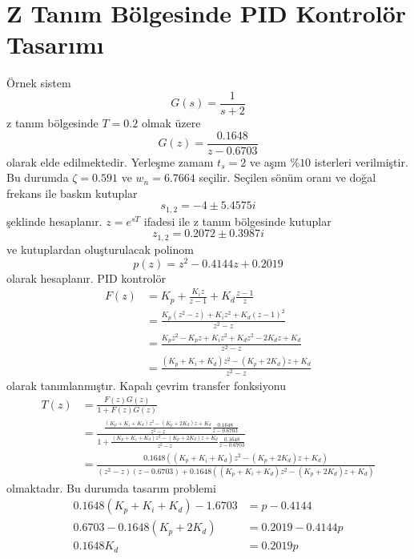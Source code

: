 \chapter{Z Tanım Bölgesinde PID Kontrolör Tasarımı}
Örnek sistem
\begin{equation}
    G(s)=\frac{1}{s+2}
\end{equation}
z tanım bölgesinde $T=0.2$ olmak üzere
\begin{equation}
    G(z)=\frac{0.1648}{z-0.6703}
\end{equation}
olarak elde edilmektedir. Yerleşme zamanı $t_s=2$ ve aşım $\%10$ isterleri verilmiştir. Bu durumda $\zeta=0.591$ ve $w_n=6.7664$ seçilir. Seçilen sönüm oranı ve doğal frekans ile baskın kutuplar
\begin{equation}
    s_{1,2}=-4 \pm 5.4575i
\end{equation}
şeklinde hesaplanır. $z=e^{sT}$ ifadesi ile z tanım bölgesinde kutuplar
\begin{equation}
    z_{1,2}=0.2072 \pm 0.3987i
\end{equation}
ve kutuplardan oluşturulacak polinom
\begin{equation}
    p(z)=z^2-0.4144 z+0.2019
\end{equation}
olarak hesaplanır. PID kontrolör
\begin{equation}
\begin{split}
    F(z)&=K_p+\frac{K_iz}{z-1}+K_d\frac{z-1}{z}\\
    &=\frac{K_p(z^2-z)+K_iz^2+K_d(z-1)^2}{z^2-z}\\
    &=\frac{K_pz^2-K_pz+K_iz^2+K_dz^2-2K_dz+K_d}{z^2-z}\\
    &=\frac{(K_p+K_i+K_d)z^2-(K_p+2K_d)z+K_d}{z^2-z}
\end{split}
\end{equation}
olarak tanımlanmıştır. Kapalı çevrim transfer fonksiyonu
\begin{equation}
    \begin{split}
        T(z)&=\frac{F(z)G(z)}{1+F(z)G(z)}\\
        &=\frac{\frac{(K_p+K_i+K_d)z^2-(K_p+2K_d)z+K_d}{z^2-z}\frac{0.1648}{z-0.6703}}{1+\frac{(K_p+K_i+K_d)z^2-(K_p+2K_d)z+K_d}{z^2-z}\frac{0.1648}{z-0.6703}}\\
        &=\frac{0.1648((K_p+K_i+K_d)z^2-(K_p+2K_d)z+K_d)}{(z^2-z)(z-0.6703)+0.1648((K_p+K_i+K_d)z^2-(K_p+2K_d)z+K_d)}
    \end{split}
\end{equation}
olmaktadır. Bu durumda tasarım problemi
\begin{equation}
    \begin{split}
        0.1648(K_p+K_i+K_d)-1.6703&= p- 0.4144\\
        0.6703-0.1648(K_p+2K_d)&=0.2019 - 0.4144p\\
        0.1648K_d&=0.2019p
    \end{split}
\end{equation}
